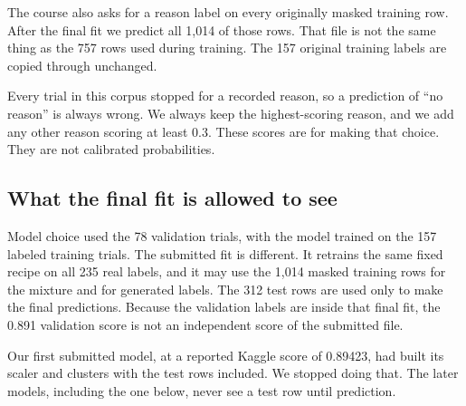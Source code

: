 The course also asks for a reason label on every originally masked training row.
After the final fit we predict all 1,014 of those rows. That file is not the
same thing as the 757 rows used during training. The 157 original training
labels are copied through unchanged.

Every trial in this corpus stopped for a recorded reason, so a prediction of
``no reason'' is always wrong. We always keep the highest-scoring reason, and we
add any other reason scoring at least 0.3. These scores are for making that
choice. They are not calibrated probabilities.

\subsection{What the final fit is allowed to see}

Model choice used the 78 validation trials, with the model trained on the 157
labeled training trials. The submitted fit is different. It retrains the same
fixed recipe on all 235 real labels, and it may use the 1,014 masked training
rows for the mixture and for generated labels. The 312 test rows are used only
to make the final predictions. Because the validation labels are inside that
final fit, the 0.891 validation score is not an independent score of the
submitted file.

Our first submitted model, at a reported Kaggle score of 0.89423, had built its
scaler and clusters with the test rows included. We stopped doing that. The
later models, including the one below, never see a test row until prediction.
